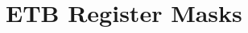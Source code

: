 \hypertarget{group___e_t_b___register___masks}{}\section{E\+TB Register Masks}
\label{group___e_t_b___register___masks}
